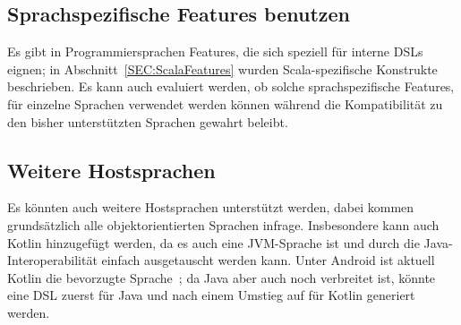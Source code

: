 \documentclass[../InterneDSLs.tex]{subfiles}
\begin{document}
\subsection{Sprachspezifische Features benutzen}
Es gibt in Programmiersprachen Features, die sich speziell für interne DSLs eignen; in Abschnitt~\ref{SEC:ScalaFeatures} wurden Scala-spezifische Konstrukte beschrieben.
Es kann auch evaluiert werden, ob solche sprachspezifische Features, für einzelne Sprachen verwendet werden können während die Kompatibilität zu den bisher unterstützten Sprachen gewahrt beleibt.

\subsection{Weitere Hostsprachen}
Es könnten auch weitere Hostsprachen unterstützt werden, dabei kommen grundsätzlich alle objektorientierten Sprachen infrage. Insbesondere kann auch Kotlin hinzugefügt werden, da es auch eine JVM-Sprache ist und durch die Java-Interoperabilität einfach ausgetauscht werden kann. Unter Android ist aktuell Kotlin die bevorzugte Sprache~\cite{kotlin.androiddevelopers}; da Java aber auch noch verbreitet ist, könnte eine DSL zuerst für Java und nach einem Umstieg auf für Kotlin generiert werden.
\end{document}
